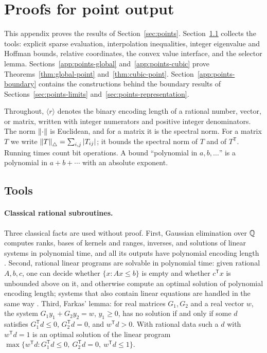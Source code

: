 \section{Proofs for point output}\label{app:points}

This appendix proves the results of Section~\ref{sec:points}.
Section~\ref{app:points-tools} collects the tools: explicit sparse
evaluation, interpolation inequalities, integer eigenvalue and Hoffman
bounds, relative coordinates, the convex value interface, and the selector
lemma. Sections~\ref{app:points-global} and~\ref{app:points-cubic} prove
Theorems~\ref{thm:global-point} and~\ref{thm:cubic-point}.
Section~\ref{app:points-boundary} contains the constructions behind the
boundary results of Sections~\ref{sec:points-limits}
and~\ref{sec:points-representation}.

Throughout, $\langle r\rangle$ denotes the binary encoding length of a
rational number, vector, or matrix, written with integer numerators and
positive integer denominators. The norm $\left\lVert\cdot\right\rVert$ is Euclidean, and
for a matrix it is the spectral norm. For a matrix $T$ we write
$\left\lVert T\right\rVert_\triangle=\sum_{i,j}|T_{ij}|$; it bounds the spectral norm of $T$
and of $T^{\mathsf T}$. Running times count bit operations. A bound
``polynomial in $a,b,\ldots$'' is a polynomial in $a+b+\cdots$ with an
absolute exponent.

\subsection{Tools}\label{app:points-tools}

\paragraph{Classical rational subroutines.}
Three classical facts are used without proof. First, Gaussian elimination
over $\mathbb Q$ computes ranks, bases of kernels and ranges, inverses, and
solutions of linear systems in polynomial time, and all its outputs have
polynomial encoding length \citep[Section~1.4]{GroetschelLovaszSchrijver1988}.
Second, rational linear programs are solvable in polynomial time: given
rational $A,b,c$, one can decide whether $\{x:Ax\le b\}$ is empty and
whether $c^{\mathsf T}x$ is unbounded above on it, and otherwise compute an
optimal solution of polynomial encoding length; systems that also contain
linear equations are handled in the same way
\citep[Theorem~(6.4.12) and Section~6.5]{GroetschelLovaszSchrijver1988}.
Third, Farkas' lemma: for real matrices $G_1,G_2$ and a real vector $w$,
the system $G_1y_1+G_2y_2=w$, $y_1\ge0$, has no solution if and only if
some $d$ satisfies $G_1^{\mathsf T}d\le0$, $G_2^{\mathsf T}d=0$, and
$w^{\mathsf T}d>0$. With rational data such a $d$ with $w^{\mathsf T}d=1$
is an optimal solution of the linear program
$\max\{w^{\mathsf T}d:G_1^{\mathsf T}d\le0,\ G_2^{\mathsf T}d=0,\
w^{\mathsf T}d\le1\}$.

